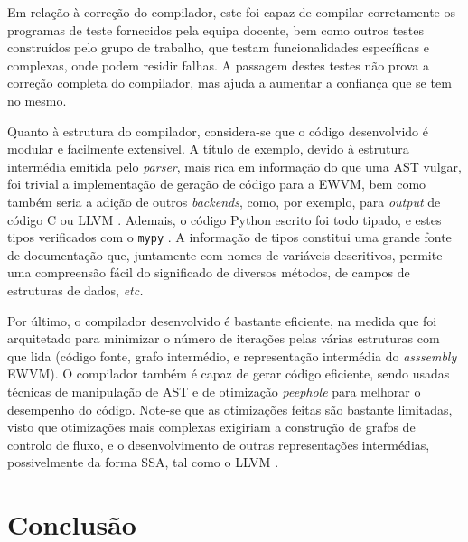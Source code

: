 \documentclass[12pt, a4paper]{article}
\begin{document}
Em relação à correção do compilador, este foi capaz de compilar corretamente os programas de teste
fornecidos pela equipa docente, bem como outros testes construídos pelo grupo de trabalho, que
testam funcionalidades específicas e complexas, onde podem residir falhas. A passagem destes testes
não prova a correção completa do compilador, mas ajuda a aumentar a confiança que se tem no mesmo.

Quanto à estrutura do compilador, considera-se que o código desenvolvido é modular e facilmente
extensível. A título de exemplo, devido à estrutura intermédia emitida pelo \emph{parser}, mais rica
em informação do que uma AST vulgar, foi trivial a implementação de geração de código para a EWVM,
bem como também seria a adição de outros \emph{backends}, como, por exemplo, para \emph{output} de
código C \cite{c} ou LLVM \cite{llvm}. Ademais, o código Python escrito foi todo tipado, e estes
tipos verificados com o \texttt{mypy} \cite{mypy}. A informação de tipos constitui uma grande fonte
de documentação que, juntamente com nomes de variáveis descritivos, permite uma compreensão fácil
do significado de diversos métodos, de campos de estruturas de dados, \emph{etc.}

Por último, o compilador desenvolvido é bastante eficiente, na medida que foi arquitetado para
minimizar o número de iterações pelas várias estruturas com que lida (código fonte, grafo
intermédio, e representação intermédia do \emph{asssembly} EWVM). O compilador também é capaz de
gerar código eficiente, sendo usadas técnicas de manipulação de AST e de otimização \emph{peephole}
para melhorar o desempenho do código. Note-se que as otimizações feitas são bastante limitadas,
visto que otimizações mais complexas exigiriam a construção de grafos de controlo de fluxo, e o
desenvolvimento de outras representações intermédias, possivelmente da forma SSA, tal como o LLVM
\cite{llvm}.

\section{Conclusão}
\end{document}
